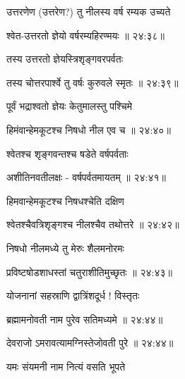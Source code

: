 {\devanagarifont उत्तरणेण (उत्तरेण?) तु नीलस्य वर्ष रम्यक उच्यते \thinspace{\dandab} \dontdisplaylinenum }%
 

{\devanagarifont श्वेत-उत्तरतो ज्ञेयो वर्षरम्यहिरण्मयः {॥ २४:३८॥} \veg\dontdisplaylinenum }%
 
{\devanagarifont तस्य उत्तरतो ज्ञेयस्त्रिशृङ्गवरपर्वतः \thinspace{\dandab} \dontdisplaylinenum }%
 

{\devanagarifont तस्य चोत्तरपार्श्वे तु वर्षः कुरुवले स्मृतः {॥ २४:३९॥} \veg\dontdisplaylinenum }%
 
{\devanagarifont पूर्वं भद्राश्वतो ज्ञेयः केतुमालस्तु पश्चिमे \thinspace{\dandab} \dontdisplaylinenum }%
 

{\devanagarifont हिमंवान्हेमकूटश्च निषधो नील एव च {॥ २४:४०॥} \veg\dontdisplaylinenum }%
 
{\devanagarifont श्वेतश्च शृङ्गवन्तश्च षडेते वर्षपर्वताः \thinspace{\dandab} \dontdisplaylinenum }%
 

{\devanagarifont अशीतिनवतीलक्षः - वर्षपर्वतमायतम् {॥ २४:४१॥} \veg\dontdisplaylinenum }%
 
{\devanagarifont हिमवान्हेमकूटश्च निषधश्चेति दक्षिण \thinspace{\dandab} \dontdisplaylinenum }%
 

{\devanagarifont श्वेतश्चैवत्रिशृङ्गश्च नीलश्चैव तथोत्तरे {॥ २४:४२॥} \veg\dontdisplaylinenum }%
 
{\devanagarifont निषधो नीलमध्ये तु मेरुः शैलमनोरमः \thinspace{\dandab} \dontdisplaylinenum }%
 

{\devanagarifont प्रविष्टषोडशाधस्तां चतुराशीतिमुच्छृतः {॥ २४:४३॥} \veg\dontdisplaylinenum }%
 
{\devanagarifont योजनानां सहस्राणि द्वात्रिंशदूर्ध ! विस्तृतः \thinspace{\dandab} \dontdisplaylinenum }%
 

{\devanagarifont ब्रह्मामनोवती नाम पुरेव सतिमध्यमे {॥ २४:४४॥} \veg\dontdisplaylinenum }%
 

{\devanagarifont देवराजो ऽमरावत्यामग्निस्तेजोवती पुरे {॥ २४:४४॥} \veg\dontdisplaylinenum }%
 
{\devanagarifont यमः संयमनी नाम नित्यं वसति भूपते \thinspace{\dandab} \dontdisplaylinenum }%
 
